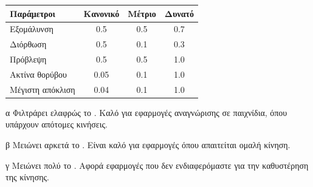 \begin{center}
    \begin{threeparttable}
        \begin{tabular}{lccc}
            \toprule
            Παράμετροι & Κανονικό\tnote{α} & Μέτριο\tnote{β} & Δυνατό\tnote{γ} \\
            \midrule
            Εξομάλυνση & 0.5 & 0.5 & 0.7 \\
            Διόρθωση & 0.5 & 0.1 & 0.3 \\
            Πρόβλεψη & 0.5 & 0.5 & 1.0 \\
            Ακτίνα θορύβου & 0.05 & 0.1 & 1.0 \\
            Μέγιστη απόκλιση & 0.04 & 0.1 & 1.0 \\
            \bottomrule
        \end{tabular}
        \begin{tablenotes}
            \item[α] Φιλτράρει ελαφρώς το . Καλό για εφαρμογές αναγνώρισης σε παιχνίδια, όπου υπάρχουν απότομες κινήσεις.
            \item[β] Μειώνει αρκετά το . Είναι καλό για εφαρμογές όπου απαιτείται ομαλή κίνηση.
            \item[γ] Μειώνει πολύ το . Αφορά εφαρμογές που δεν ενδιαφερόμαστε για την καθυστέρηση της κίνησης.
        \end{tablenotes}
    \end{threeparttable}
    \label{tab:filter-parameters}
\end{center}


